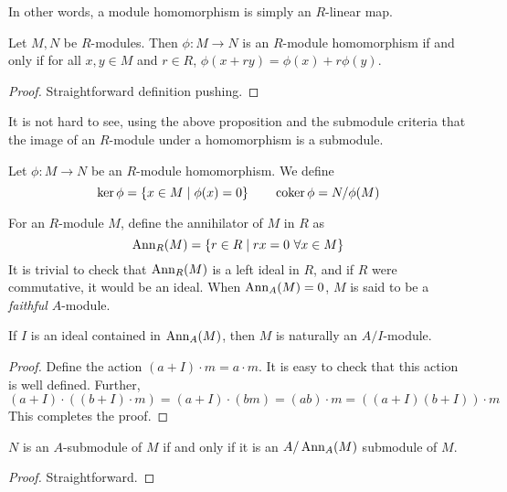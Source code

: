 In other words, a module homomorphism is simply an $R$-linear map. 

\begin{proposition}
    Let $M, N$ be $R$-modules. Then $\phi: M\to N$ is an $R$-module homomorphism if and only if for all $x,y\in M$ and $r\in R$, $\phi(x + ry) = \phi(x) + r\phi(y)$.
\end{proposition}
\begin{proof}
    Straightforward definition pushing.
\end{proof}

It is not hard to see, using the above proposition and the submodule criteria that the image of an $R$-module under a homomorphism is a submodule.


\begin{definition}
    Let $\phi:M\to N$ be an $R$-module homomorphism. We define 
    \begin{equation*}
        \ker\phi = \{x\in M\mid\phi(x) = 0\}\qquad\operatorname{coker}\phi = N/\phi(M)
    \end{equation*}
\end{definition}

For an $R$-module $M$, define the annihilator of $M$ in $R$ as 
\begin{equation*}
    \operatorname{Ann}_R(M) = \{r\in R\mid rx = 0~\forall x\in M\}
\end{equation*}
It is trivial to check that $\operatorname{Ann}_R(M)$ is a left ideal in $R$, and if $R$ were commutative, it would be an ideal. When $\operatorname{Ann}_A(M) = 0$, $M$ is said to be a \textit{faithful} $A$-module.

\begin{proposition}
    If $I$ is an ideal contained in $\operatorname{Ann}_A(M)$, then $M$ is naturally an $A/I$-module.
\end{proposition}
\begin{proof}
    Define the action $(a + I)\cdot m = a\cdot m$. It is easy to check that this action is well defined. Further, 
    \begin{equation*}
        (a + I)\cdot((b + I)\cdot m) = (a + I)\cdot(bm) = (ab)\cdot m = ((a + I)(b + I))\cdot m
    \end{equation*}
    This completes the proof.
\end{proof}

\begin{proposition}
    $N$ is an $A$-submodule of $M$ if and only if it is an $A/\operatorname{Ann}_A(M)$ submodule of $M$.
\end{proposition}
\begin{proof}
    Straightforward.
\end{proof}

